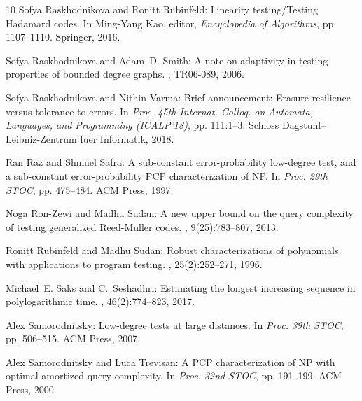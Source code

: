 \documentclass[11pt]{article}
\numberwithin{equation}{section}
\theoremstyle{definition}
\theoremstyle{plain}
\begin{document}
\begin{thebibliography}{10}
{\sc Sofya Raskhodnikova and Ronitt Rubinfeld}: Linearity testing/{T}esting
  {H}adamard codes.
\newblock In {\sc Ming-Yang Kao}, editor, {\em Encyclopedia of Algorithms}, pp.
  1107--1110. Springer, 2016.
\newblock [\epfmtdoi{10.1007/978-1-4939-2864-4\_202}]

{\sc Sofya Raskhodnikova and Adam~D. Smith}: A note on adaptivity in testing
  properties of bounded degree graphs.
, TR06-089, 2006.

{\sc Sofya Raskhodnikova and Nithin Varma}: Brief announcement:
  Erasure-resilience versus tolerance to errors.
\newblock In {\em Proc. 45th Internat. Colloq. on Automata, Languages, and
  Programming (ICALP'18)}, pp. 111:1--3. Schloss Dagstuhl--Leibniz-Zentrum fuer
  Informatik, 2018.

{\sc Ran Raz and Shmuel Safra}: A sub-constant error-probability low-degree
  test, and a sub-constant error-probability {PCP} characterization of {NP}.
\newblock In {\em Proc. 29th STOC}, pp. 475--484. ACM Press, 1997.
\newblock [\epfmtdoi{10.1145/258533.258641}]

{\sc Noga Ron{-}Zewi and Madhu Sudan}: A new upper bound on the query
  complexity of testing generalized {Reed-Muller} codes.
, 9(25):783--807, 2013.

{\sc Ronitt Rubinfeld and Madhu Sudan}: Robust characterizations of polynomials
  with applications to program testing.
, 25(2):252--271, 1996.
\newblock [\epfmtdoi{10.1137/S0097539793255151}]

{\sc Michael~E. Saks and C.~Seshadhri}: Estimating the longest increasing
  sequence in polylogarithmic time.
, 46(2):774--823, 2017.
\newblock [\epfmtdoi{10.1137/130942152}]

{\sc Alex Samorodnitsky}: Low-degree tests at large distances.
\newblock In {\em Proc. 39th STOC}, pp. 506--515. ACM Press, 2007.
\newblock [\epfmtdoi{10.1145/1250790.1250864}]

{\sc Alex Samorodnitsky and Luca Trevisan}: A {PCP} characterization of {NP}
  with optimal amortized query complexity.
\newblock In {\em Proc. 32nd STOC}, pp. 191--199. ACM Press, 2000.
\newblock [\epfmtdoi{10.1145/335305.335329}]


\end{thebibliography}
\end{document}
